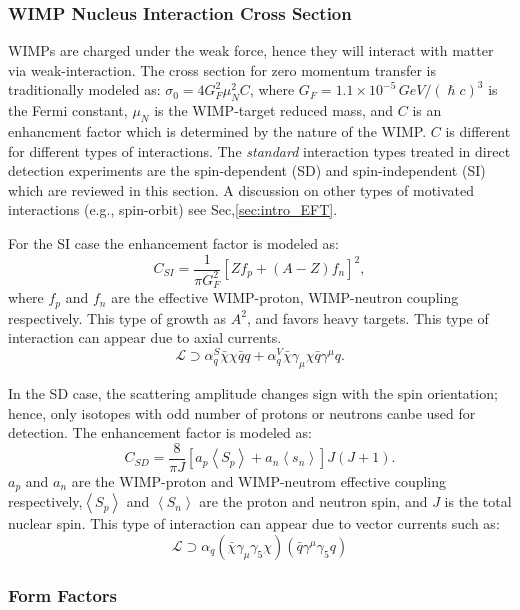 \subsubsection{WIMP Nucleus Interaction Cross Section}
\label{subsubsec:WIMP_CS}

WIMPs are charged under the weak force, hence they will interact with matter via weak-interaction. The cross section for zero momentum transfer is traditionally modeled as: $\sigma_0 = 4G^2_F\mu_N^2C$, where $G_F = 1.1\times 10^{-5}\,GeV/(\hslash c)^3$ is the Fermi constant, $\mu_N$ is the WIMP-target reduced mass, and $C$ is an enhancment factor which is determined by the nature of the WIMP. $C$ is different for different types of interactions. The \textit{standard} interaction types treated in direct detection experiments are the spin-dependent (SD) and spin-independent (SI) which are reviewed in this section. A discussion on other types of motivated interactions (e.g., spin-orbit) see Sec,\ref{sec:intro_EFT}.

For the SI case the enhancement factor is modeled as:
\begin{equation}
C_{SI} = \frac{1}{\pi G_F^2}[Zf_p + (A-Z)f_n]^2,
\end{equation} 
where $f_p$ and $f_n$ are the effective WIMP-proton, WIMP-neutron coupling respectively. This type of growth as $A^2$, and favors heavy targets. This type of interaction can appear due to axial currents.
\begin{equation}
\mathcal{L} \supset \alpha_q^S \bar{\chi} \chi \bar{q}q + \alpha_q^V\bar{\chi}\gamma_\mu\chi\bar{q}\gamma^\mu q.  
\end{equation}

In the SD case, the scattering amplitude changes sign with the spin orientation; hence, only isotopes with odd number of protons  or neutrons canbe used for detection. The enhancement factor is modeled as:
\begin{equation}
C_{SD} = \frac{8}{\pi J}[a_p\left<S_p\right> + a_n\left<s_n\right>]J(J+1).
\end{equation}  
$a_p$ and $a_n$ are the WIMP-proton and WIMP-neutrom effective coupling respectively,$\left<S_p\right>$ and  $\left<S_n\right>$ are the proton and neutron spin, and $J$ is the total nuclear spin. This type of interaction can appear due to vector currents such as:
\begin{equation}
\mathcal{L} \supset \alpha_q(\bar{\chi}\gamma_\mu\gamma_5\chi)(\bar{q}\gamma^\mu\gamma_5q)
\end{equation}
\subsubsection{Form Factors}


